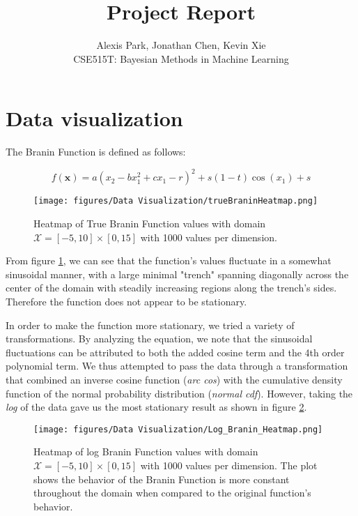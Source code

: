 \documentclass[11pt]{article}
\newcommand{\Course}{CSE515T: Bayesian Methods in Machine Learning}
\newcommand{\mc}[1]{\mathcal{#1}}
\numberwithin{equation}{section}
\begin{document}
\title{Project Report}
\author{Alexis Park, Jonathan Chen, Kevin Xie \\ \Course}

\maketitle

\section{Data visualization}

The Branin Function is defined as follows:

\begin{equation}
  f(\bm{x}) = a(x_2 - bx_1^2 + cx_1 - r)^2 + s(1 - t)\cos(x_1) + s
  \label{eq:Branin}
\end{equation}

\begin{figure}[H]
  \centering
  \texttt{[image: figures/Data Visualization/trueBraninHeatmap.png]}
  \caption{Heatmap of True Branin Function values with domain $\mc{X} = [-5, 10] \times [0, 15]$  with 1000 values per dimension.}
  \label{fig:true_Branin_heatmap}
\end{figure}

From figure \ref{fig:true_Branin_heatmap}, we can see that the function's values fluctuate in a somewhat sinusoidal manner, with a large minimal "trench" spanning diagonally across the center of the domain with steadily increasing regions along the trench's sides. Therefore the function does not appear to be stationary.

In order to make the function more stationary, we tried a variety of transformations. By analyzing the equation, we note that the sinusoidal fluctuations can be attributed to both the added cosine term and the 4th order polynomial term. We thus attempted to pass the data through a transformation that combined an inverse cosine function (\emph{arc cos}) with the cumulative density function of the normal probability distribution (\emph{normal cdf}). However, taking the \emph{log} of the data gave us the most stationary result as shown in figure \ref{fig:log_Branin_heatmap}. 

\begin{figure}[H]
  \centering
  \texttt{[image: figures/Data Visualization/Log\_Branin\_Heatmap.png]}
  \caption{Heatmap of log Branin Function values with domain $\mc{X} = [-5, 10] \times [0, 15]$  with 1000 values per dimension. The plot shows the behavior of the Branin Function is more constant throughout the domain when compared to the original function's behavior.}
  \label{fig:log_Branin_heatmap}
\end{figure}
\end{document}
